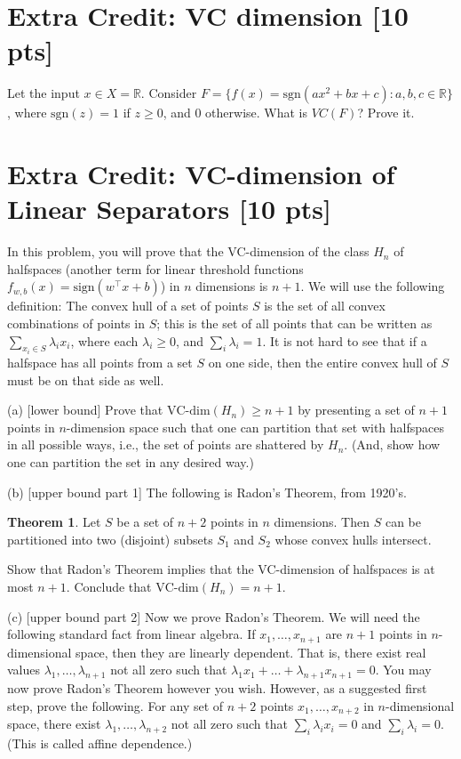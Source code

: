 \documentclass[a4paper]{article}
\theoremstyle{definition}
\newtheorem{theorem}{Theorem}[]
\newcommand{\sgn}{\mathrm{sgn}}
\def\R{\mathbb R}
\begin{document}
\section{Extra Credit: VC dimension [10 pts]}
Let the input $x\in X=\R$.
Consider $F=\{f(x)=\sgn(ax^2+bx+c): a, b, c \in \R\}$, where $\sgn(z)=1$ if $z\ge0$, and 0 otherwise.
What is $VC(F)$?  Prove it.



\section{Extra Credit: VC-dimension of Linear Separators [10 pts]}
In this problem, you will prove that the VC-dimension of the class $H_n$ of halfspaces (another term for linear threshold functions $f_{w,b}(x) = \text{sign}(w^\top x + b)$) in $n$ dimensions is $n+1$. We will use the following definition: The convex hull of a set of points $S$ is the set of all convex combinations of points in $S$; this is the set of all points that can be written as $\sum_{x_i \in S} \lambda_i x_i$, where each $\lambda_i \ge 0$, and $\sum_i \lambda_i = 1$. It is not hard to see that if a halfspace has all points from a set $S$ on one side, then the entire convex hull of $S$ must be on that side as well. 

(a) [lower bound] Prove that $\text{VC-dim}(H_n) \ge n+1$ by presenting a set of $n+1$ points in $n$-dimension space such that one can partition that set with halfspaces in all possible ways, i.e., the set of points are shattered by $H_n$. (And, show how one can partition the set in any desired way.)

(b) [upper bound part 1] The following is Radon's Theorem, from 1920's. 
\begin{theorem} 
Let $S$ be a set of $n+2$ points in $n$ dimensions. Then $S$ can be partitioned into two (disjoint) subsets $S_1$ and $S_2$ whose convex hulls intersect. 
\end{theorem}
Show that Radon's Theorem implies that the VC-dimension of halfspaces is at most $n+1$. Conclude that $\text{VC-dim}(H_n) = n+1$.

(c) [upper bound part 2] Now we prove Radon's Theorem. We will need the following standard fact from linear algebra. If $x_1, \ldots, x_{n+1}$ are $n+1$ points in $n$-dimensional space, then they are linearly dependent. That is, there exist real values $\lambda_1, \ldots, \lambda_{n+1}$ not all zero such that $\lambda_1 x_1 + \ldots + \lambda_{n+1} x_{n+1} = 0$.
You may now prove Radon's Theorem however you wish. However, as a suggested first step, prove the following. For any set of $n+2$ points $x_1, \ldots, x_{n+2}$ in $n$-dimensional space, there exist $\lambda_1, \ldots, \lambda_{n+2}$ not all zero such that $\sum_i \lambda_i x_i = 0$ and $\sum_i \lambda_i = 0$. (This is called affine dependence.)
\end{document}
